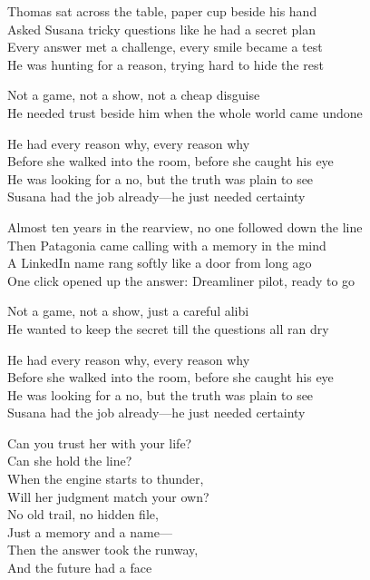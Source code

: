 \begin{lyrics}
Thomas sat across the table, paper cup beside his hand\\
Asked Susana tricky questions like he had a secret plan\\
Every answer met a challenge, every smile became a test\\
He was hunting for a reason, trying hard to hide the rest

Not a game, not a show, not a cheap disguise\\
He needed trust beside him when the whole world came undone

He had every reason why, every reason why\\
Before she walked into the room, before she caught his eye\\
He was looking for a no, but the truth was plain to see\\
Susana had the job already—he just needed certainty

Almost ten years in the rearview, no one followed down the line\\
Then Patagonia came calling with a memory in the mind\\
A LinkedIn name rang softly like a door from long ago\\
One click opened up the answer: Dreamliner pilot, ready to go

Not a game, not a show, just a careful alibi\\
He wanted to keep the secret till the questions all ran dry

He had every reason why, every reason why\\
Before she walked into the room, before she caught his eye\\
He was looking for a no, but the truth was plain to see\\
Susana had the job already—he just needed certainty

Can you trust her with your life?\\
Can she hold the line?\\
When the engine starts to thunder,\\
Will her judgment match your own?\\
No old trail, no hidden file,\\
Just a memory and a name—\\
Then the answer took the runway,\\
And the future had a face


\end{lyrics}
